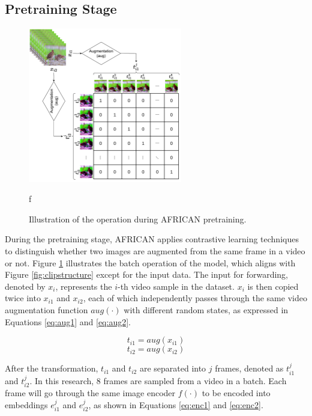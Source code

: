 \subsection{Pretraining Stage}

\begin{figure}[ht]
    \centering
    \includegraphics[width=0.6\textwidth]{assets/charts/3_3_ConstrastiveSimilarityMatrix}
    \caption[Operation of pretraining AFRICAN]{Illustration of the operation during AFRICAN pretraining.}
f\label{fig:modelstructafsim}
\end{figure}

During the pretraining stage, AFRICAN applies contrastive learning techniques to distinguish whether two images are augmented from the same frame in a video or not. Figure \ref{fig:modelstructafsim} illustrates the batch operation of the model, which aligns with Figure \ref{fig:clipstructure} except for the input data. The input for forwarding, denoted by $x_i$, represents the $i$-th video sample in the dataset. $x_i$ is then copied twice into $x_{i1}$ and $x_{i2}$, each of which independently passes through the same video augmentation function $aug(\cdot)$ with different random states, as expressed in Equations \ref{eq:aug1} and \ref{eq:aug2}. 

\begin{equation}
    \label{eq:aug1}
    t_{i1} = aug(x_{i1})
\end{equation}
\begin{equation}
    \label{eq:aug2}
    t_{i2} = aug(x_{i2})
\end{equation}

After the transformation, $t_{i1}$ and $t_{i2}$ are separated into $j$ frames, denoted as $t_{i1}^j$ and $t_{i2}^j$. In this research, 8 frames are sampled from a video in a batch. Each frame will go through the same image encoder $f(\cdot)$ to be encoded into embeddings $e_{i1}^j$ and $e_{i2}^j$, as shown in Equations \ref{eq:enc1} and \ref{eq:enc2}.

